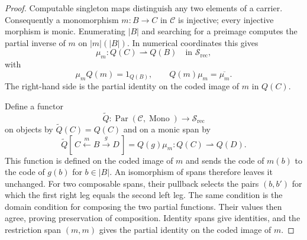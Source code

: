 \begin{proof}
Computable singleton maps distinguish any two elements of a carrier.
Consequently a monomorphism $m:B\to C$ in $\mathcal C$ is
injective; every injective morphism is monic. Enumerating $|B|$ and
searching for a preimage computes the partial inverse of $m$ on
$|m|(|B|)$. In numerical coordinates this gives
\[
 \mu_m:Q(C)\rightharpoonup Q(B)
       \quad\text{in }\mathscr S_{\mathrm{rec}},
\]
with
\[
 \mu_mQ(m)=1_{Q(B)},\qquad
 Q(m)\mu_m=\overline{\mu_m}.
\]
The right-hand side is the partial identity on the coded image
of $m$ in $Q(C)$.

Define a functor
\[
 \widetilde Q:\operatorname{Par}(\mathcal C,\operatorname{Mono})
                 \longrightarrow\mathscr S_{\mathrm{rec}}
\]
on objects by $\widetilde Q(C)=Q(C)$ and on a monic span by
\[
 \widetilde Q[\,C\xleftarrow{m}B\xrightarrow{g}D\,]
       =Q(g)\mu_m:Q(C)\rightharpoonup Q(D).
\]
This function is defined on the coded image of $m$ and sends
the code of $m(b)$ to the code of $g(b)$ for $b\in|B|$. An isomorphism of spans therefore leaves it
unchanged. For two composable spans, their pullback selects
the pairs $(b,b')$ for which the first right leg equals the second
left leg. The same condition is the domain condition for composing
the two partial functions. Their values then agree, proving
preservation of composition. Identity spans give identities, and
the restriction span $(m,m)$ gives the partial identity on the coded image of $m$.


\end{proof}

